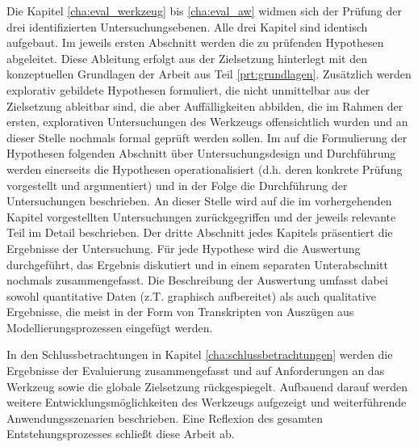 Die Kapitel \ref{cha:eval_werkzeug} bis \ref{cha:eval_aw} widmen sich der Prüfung der drei identifizierten Untersuchungsebenen. Alle drei Kapitel sind identisch aufgebaut. Im jeweils ersten Abschnitt werden die zu prüfenden Hypothesen abgeleitet. Diese Ableitung erfolgt aus der Zielsetzung hinterlegt mit den konzeptuellen Grundlagen der Arbeit aus Teil \ref{prt:grundlagen}. Zusätzlich werden explorativ gebildete Hypothesen formuliert, die nicht unmittelbar aus der Zielsetzung ableitbar sind, die aber Auffälligkeiten abbilden, die im Rahmen der ersten, explorativen Untersuchungen des Werkzeugs offensichtlich wurden und an dieser Stelle nochmals formal geprüft werden sollen. Im auf die Formulierung der Hypothesen folgenden Abschnitt über Untersuchungsdesign und Durchführung werden einerseits die Hypothesen operationalisiert (d.h. deren konkrete Prüfung vorgestellt und argumentiert) und in der Folge die Durchführung der Untersuchungen beschrieben. An dieser Stelle wird auf die im vorhergehenden Kapitel vorgestellten Untersuchungen zurückgegriffen und der jeweils relevante Teil im Detail beschrieben. Der dritte Abschnitt jedes Kapitels präsentiert die Ergebnisse der Untersuchung. Für jede Hypothese wird die Auswertung durchgeführt, das Ergebnis diskutiert und in einem separaten Unterabschnitt nochmals zusammengefasst. Die Beschreibung der Auswertung umfasst dabei sowohl quantitative Daten (z.T. graphisch aufbereitet) als auch qualitative Ergebnisse, die meist in der Form von Transkripten von Auszügen aus Modellierungsprozessen eingefügt werden.

In den Schlussbetrachtungen in Kapitel \ref{cha:schlussbetrachtungen} werden die Ergebnisse der Evaluierung zusammengefasst und auf Anforderungen an das Werkzeug sowie die globale Zielsetzung rückgespiegelt. Aufbauend darauf werden weitere Entwicklungsmöglichkeiten des Werkzeugs aufgezeigt und weiterführende Anwendungsszenarien beschrieben. Eine Reflexion des gesamten Entstehungsprozesses schließt diese Arbeit ab.

